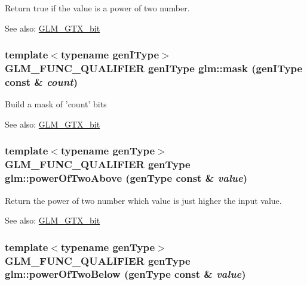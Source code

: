 Return true if the value is a power of two number. \begin{Desc}
\item[See also:]\hyperlink{group__gtx__bit}{GLM\_\-GTX\_\-bit} \end{Desc}
\hypertarget{group__gtx__bit_g7a909d8e8b8a5f73ed643bdca7602017}{
\subsubsection[mask]{\setlength{\rightskip}{0pt plus 5cm}template$<$typename genIType$>$ GLM\_\-FUNC\_\-QUALIFIER genIType glm::mask (genIType const \& {\em count})}}
\label{group__gtx__bit_g7a909d8e8b8a5f73ed643bdca7602017}


Build a mask of 'count' bits \begin{Desc}
\item[See also:]\hyperlink{group__gtx__bit}{GLM\_\-GTX\_\-bit} \end{Desc}
\hypertarget{group__gtx__bit_gf27d271ec57b96b6acae9395b9c4a365}{
\subsubsection[powerOfTwoAbove]{\setlength{\rightskip}{0pt plus 5cm}template$<$typename genType$>$ GLM\_\-FUNC\_\-QUALIFIER genType glm::powerOfTwoAbove (genType const \& {\em value})}}
\label{group__gtx__bit_gf27d271ec57b96b6acae9395b9c4a365}


Return the power of two number which value is just higher the input value. \begin{Desc}
\item[See also:]\hyperlink{group__gtx__bit}{GLM\_\-GTX\_\-bit} \end{Desc}
\hypertarget{group__gtx__bit_ga0bb1687b43f594a471c5506cc505dce}{
\subsubsection[powerOfTwoBelow]{\setlength{\rightskip}{0pt plus 5cm}template$<$typename genType$>$ GLM\_\-FUNC\_\-QUALIFIER genType glm::powerOfTwoBelow (genType const \& {\em value})}}
\label{group__gtx__bit_ga0bb1687b43f594a471c5506cc505dce}


